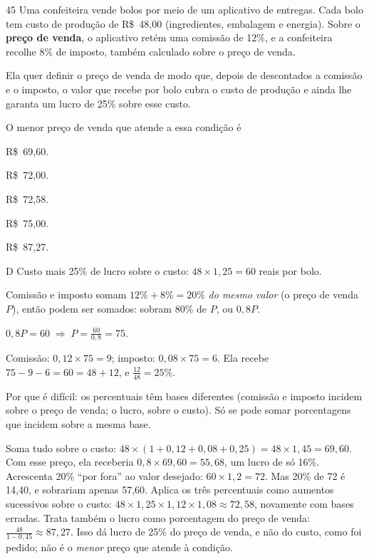 \begin{questaoinedita}{4}{5}
Uma confeiteira vende bolos por meio de um aplicativo de entregas. Cada bolo
tem custo de produção de R\$~48,00 (ingredientes, embalagem e energia). Sobre o
\textbf{preço de venda}, o aplicativo retém uma comissão de 12\%, e a
confeiteira recolhe 8\% de imposto, também calculado sobre o preço de venda.

Ela quer definir o preço de venda de modo que, depois de descontados a
comissão e o imposto, o valor que recebe por bolo cubra o custo de produção e
ainda lhe garanta um lucro de 25\% sobre esse custo.

O menor preço de venda que atende a essa condição é
\begin{alternativas*}[5]
  \item R\$~69,60.
  \item R\$~72,00.
  \item R\$~72,58.
  \item R\$~75,00.
  \item R\$~87,27.
\end{alternativas*}
\end{questaoinedita}
\begin{resolucao}{D}
 Custo mais 25\% de lucro sobre o custo:
$48\times 1{,}25 = 60$ reais por bolo.

 Comissão e imposto somam
$12\% + 8\% = 20\%$ \emph{do mesmo valor} (o preço de venda $P$), então podem ser
somados: sobram $80\%$ de $P$, ou $0{,}8P$.

 $0{,}8P = 60 \;\Rightarrow\; P = \frac{60}{0{,}8} = 75$.

 Comissão: $0{,}12\times 75 = 9$; imposto:
$0{,}08\times 75 = 6$. Ela recebe $75 - 9 - 6 = 60 = 48 + 12$, e
$\frac{12}{48} = 25\%$.


Por que é difícil: os percentuais têm bases diferentes (comissão e imposto
incidem sobre o preço de venda; o lucro, sobre o custo). Só se pode somar
porcentagens que incidem sobre a mesma base.
\begin{distratores}
 Soma tudo sobre o custo: $48\times(1 + 0{,}12 + 0{,}08 + 0{,}25) = 48\times
1{,}45 = 69{,}60$. Com esse preço, ela receberia $0{,}8\times 69{,}60 = 55{,}68$,
um lucro de só 16\%.
 Acrescenta 20\% ``por fora'' ao valor desejado: $60\times 1{,}2 = 72$. Mas
20\% de 72 é 14,40, e sobrariam apenas 57,60.
 Aplica os três percentuais como aumentos sucessivos sobre o custo:
$48\times 1{,}25\times 1{,}12\times 1{,}08\approx 72{,}58$, novamente com bases
erradas.
 Trata também o lucro como porcentagem do preço de venda:
$\frac{48}{1 - 0{,}45}\approx 87{,}27$. Isso dá lucro de 25\% do preço de venda,
e não do custo, como foi pedido; não é o \emph{menor} preço que atende à condição.
\end{distratores}
\end{resolucao}
